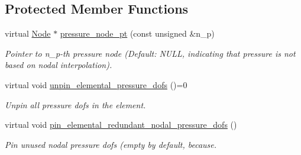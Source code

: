 \subsection*{Protected Member Functions}
\begin{DoxyCompactItemize}
\item 
virtual \hyperlink{classoomph_1_1Node}{Node} $\ast$ \hyperlink{classoomph_1_1RefineableAxisymmetricNavierStokesEquations_aa7fd86165c3410ed4c7ea736d6c3d976}{pressure\+\_\+node\+\_\+pt} (const unsigned \&n\+\_\+p)
\begin{DoxyCompactList}\small\item\em Pointer to n\+\_\+p-\/th pressure node (Default\+: N\+U\+LL, indicating that pressure is not based on nodal interpolation). \end{DoxyCompactList}\item 
virtual void \hyperlink{classoomph_1_1RefineableAxisymmetricNavierStokesEquations_a01009bc617cad72b7467b5e947e7be88}{unpin\+\_\+elemental\+\_\+pressure\+\_\+dofs} ()=0
\begin{DoxyCompactList}\small\item\em Unpin all pressure dofs in the element. \end{DoxyCompactList}\item 
virtual void \hyperlink{classoomph_1_1RefineableAxisymmetricNavierStokesEquations_ae64d696cc2f48517adb894d9732a5d20}{pin\+\_\+elemental\+\_\+redundant\+\_\+nodal\+\_\+pressure\+\_\+dofs} ()
\begin{DoxyCompactList}\small\item\em Pin unused nodal pressure dofs (empty by default, because. \end{DoxyCompactList}\end{DoxyCompactItemize}
